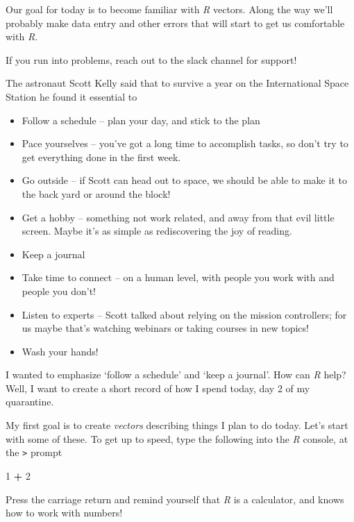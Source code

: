 \documentclass[
]{book}
\newenvironment{Shaded}{\begin{snugshade}}{\end{snugshade}}
\newcommand{\DecValTok}[1]{\textcolor[rgb]{0.00,0.00,0.81}{#1}}
\newcommand{\OperatorTok}[1]{\textcolor[rgb]{0.81,0.36,0.00}{\textbf{#1}}}
\newcommand{\StringTok}[1]{\textcolor[rgb]{0.31,0.60,0.02}{#1}}
\providecommand{\tightlist}{%
  \setlength{\itemsep}{0pt}\setlength{\parskip}{0pt}}
\begin{document}
Our goal for today is to become familiar with \emph{R} vectors. Along the way we'll probably make data entry and other errors that will start to get us comfortable with \emph{R}.

If you run into problems, reach out to the slack channel for support!

The astronaut Scott Kelly said that to survive a year on the International Space Station he found it essential to

\begin{itemize}
\tightlist
\item
  Follow a schedule -- plan your day, and stick to the plan
\item
  Pace yourselves -- you've got a long time to accomplish tasks, so don't try to get everything done in the first week.
\item
  Go outside -- if Scott can head out to space, we should be able to make it to the back yard or around the block!
\item
  Get a hobby -- something not work related, and away from that evil little screen. Maybe it's as simple as rediscovering the joy of reading.
\item
  Keep a journal
\item
  Take time to connect -- on a human level, with people you work with and people you don't!
\item
  Listen to experts -- Scott talked about relying on the mission controllers; for us maybe that's watching webinars or taking courses in new topics!
\item
  Wash your hands!
\end{itemize}

I wanted to emphasize `follow a schedule' and `keep a journal'. How can \emph{R} help? Well, I want to create a short record of how I spend today, day 2 of my quarantine.

My first goal is to create \emph{vectors} describing things I plan to do today. Let's start with some of these. To get up to speed, type the following into the \emph{R} console, at the \texttt{\textgreater{}} prompt

\begin{Shaded}
\begin{Highlighting}[]
\DecValTok{1} \OperatorTok{+}\StringTok{ }\DecValTok{2}
\end{Highlighting}
\end{Shaded}

Press the carriage return and remind yourself that \emph{R} is a calculator, and knows how to work with numbers!
\end{document}
